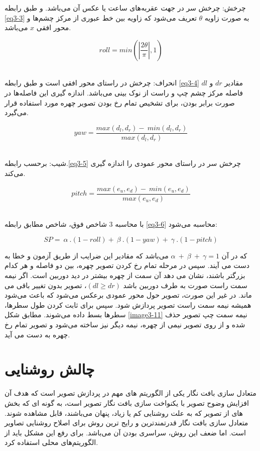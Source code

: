 \noindent
چرخش: چرخش سر در جهت عقربه‌های ساعت یا عکس آن می‌باشد. و طبق رابطه \ref{eq3-3} به صورت زاویه $\theta$ تعریف می‌شود که زاویه بین خط عبوری از مرکز چشم‌ها و محور افقی $x$ می‌باشد.

\begin{equation}
\label{eq3-3}
roll=min(\left|\frac{2\theta}{\pi}\right|,1)
\end{equation}‏

\noindent	
انحراف: چرخش در راستای محور افقی است و طبق رابطه \ref{eq3-4} مقادیر $𝑑r$ و $𝑑l$ فاصله مرکز چشم چپ و راست از نوک بینی می‌باشد. اندازه گیری این فاصله‌ها در صورت برابر بودن، برای تشخیص تمام رخ بودن تصویر چهره مورد استفاده قرار می‌گیرد.

\begin{equation}
\label{eq3-4}
yaw=\frac{max\left(d_l,d_r\right)-\ min(d_l,d_r)}{max(d_l,d_r)}
\end{equation}‏

\noindent
شیب: برحسب رابطه.\ref{eq3-5} چرخش سر در راستای محور عمودی را اندازه گیری می‌کند.

\begin{equation}
\label{eq3-5}
pitch=\frac{max\left(e_u,e_d\right)-\ min(e_u,e_d)}{max(e_u,e_d)}	
\end{equation}‏

\noindent
با محاسبه 3 شاخص فوق، شاخص  مطابق رابطه \ref{eq3-6} محاسبه می‌شود:

\begin{equation}
\label{eq3-6}
SP=\ \alpha\ .(1-roll)+\ \beta\ .(1-yaw)+\ \gamma\ .(1-pitch)	
\end{equation}

\noindent‏
که در آن‏ 
$\alpha\ +\ \beta\ +\ \gamma=1	$‏
می‌باشد که مقادیر این ضرایب از طریق آزمون و خطا به دست می آیند. سپس در مرحله تمام رخ کردن تصویر چهره، بین دو فاصله  و  هر کدام بزرگتر باشند، نشان می دهد آن سمت از چهره بیشتر در دید دوربین است. اگر نیمه سمت راست صورت به طرف دوربین باشد $(dl \geq dr)$، تصویر بدون تغییر باقی می ماند. در غیر این صورت، تصویر حول محور عمودی برعکس می‌شود که باعث می‌شود همیشه نیمه سمت راست تصویر پردازش شود. سپس برای ثابت کردن طول سطرها، سطرها بسط داده می‌شوند. مطابق شکل \ref{image3-11} نیمه سمت چپ تصویر حذف شده و از روی تصویر نیمی از چهره، نیمه دیگر نیز ساخته می‌شود و تصویر تمام رخ چهره به دست می آید.

\section{چالش روشنایی}
متعادل سازی بافت نگار یکی از الگوریتم های مهم در پردازش تصویر است که هدف آن افزایش وضوح تصویر با یکنواخت سازی بافت نگار تصویر است، به گونه ای که بخش های از تصویر که به علت روشنایی کم یا زیاد، پنهان می‌باشند، قابل مشاهده شوند. متعادل سازی بافت نگار قدرتمندترین و رایج ترین روش برای اصلاح روشنایی تصاویر است. اما ضعف این روش، سراسری بودن آن می‌باشد. برای رفع این مشکل باید از الگوریتم‌های محلی استفاده کرد.


